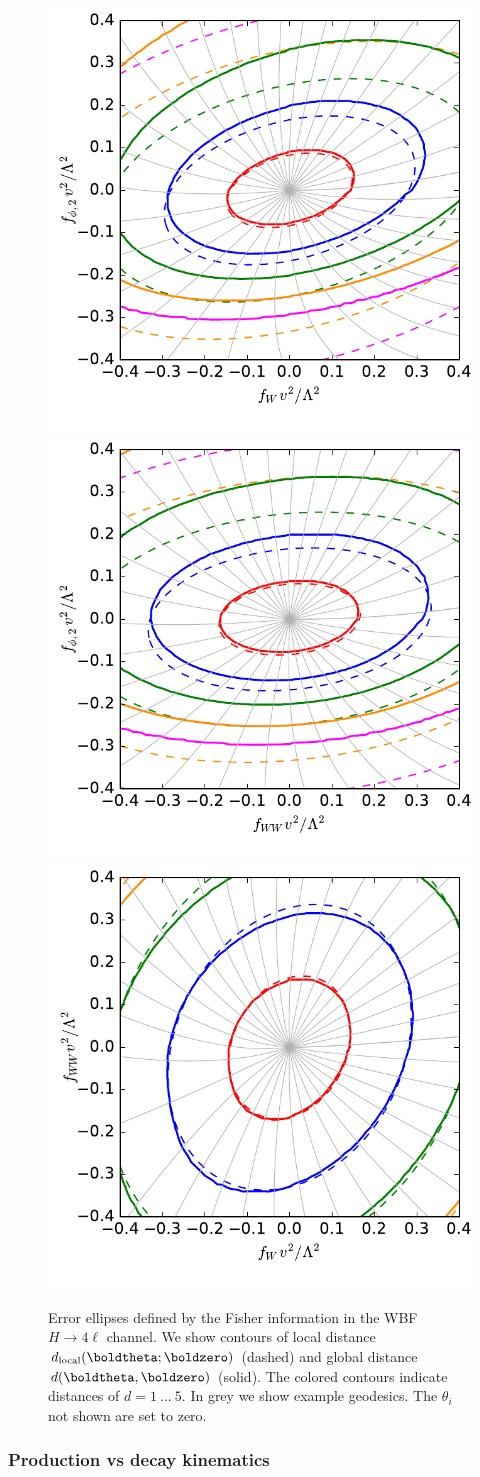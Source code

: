 \begin{figure}
  \includegraphics[height=0.34 \textwidth,clip,trim=0.3cm 0 0.05cm 0]{fig/information/wbf_4l_geometry_fphi2_fw}%
  \includegraphics[height=0.34 \textwidth,clip,trim=0.3cm 0 0.05cm 0]{fig/information/wbf_4l_geometry_fphi2_fww}%
  \includegraphics[height=0.34 \textwidth,clip,trim=0.3cm 0 0.05cm 0]{fig/information/wbf_4l_geometry_fww_fw}%
  \caption{Error ellipses defined by the Fisher information in the
    WBF $H \to 4\ell$ channel. We show contours of local distance
    $d_\text{local}(\boldtheta ; \boldzero)$ (dashed) and global
    distance $d(\boldtheta,\boldzero)$ (solid). The colored contours
    indicate distances of $d = 1~...~5$. In grey we show example
    geodesics.  The $\theta_i$ not shown are set to zero.}
\label{fig:information_wbf_4l_geometry}
\end{figure}



\subsubsection*{Production vs decay kinematics}


